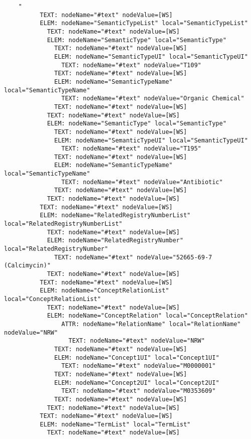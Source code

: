 \documentclass[11pt,english]{article}
\begin{document}
\begin{enumerate}
\begin{lstlisting}
    "
          TEXT: nodeName="#text" nodeValue=[WS]
          ELEM: nodeName="SemanticTypeList" local="SemanticTypeList"
            TEXT: nodeName="#text" nodeValue=[WS]
            ELEM: nodeName="SemanticType" local="SemanticType"
              TEXT: nodeName="#text" nodeValue=[WS]
              ELEM: nodeName="SemanticTypeUI" local="SemanticTypeUI"
                TEXT: nodeName="#text" nodeValue="T109"
              TEXT: nodeName="#text" nodeValue=[WS]
              ELEM: nodeName="SemanticTypeName" local="SemanticTypeName"
                TEXT: nodeName="#text" nodeValue="Organic Chemical"
              TEXT: nodeName="#text" nodeValue=[WS]
            TEXT: nodeName="#text" nodeValue=[WS]
            ELEM: nodeName="SemanticType" local="SemanticType"
              TEXT: nodeName="#text" nodeValue=[WS]
              ELEM: nodeName="SemanticTypeUI" local="SemanticTypeUI"
                TEXT: nodeName="#text" nodeValue="T195"
              TEXT: nodeName="#text" nodeValue=[WS]
              ELEM: nodeName="SemanticTypeName" local="SemanticTypeName"
                TEXT: nodeName="#text" nodeValue="Antibiotic"
              TEXT: nodeName="#text" nodeValue=[WS]
            TEXT: nodeName="#text" nodeValue=[WS]
          TEXT: nodeName="#text" nodeValue=[WS]
          ELEM: nodeName="RelatedRegistryNumberList" local="RelatedRegistryNumberList"
            TEXT: nodeName="#text" nodeValue=[WS]
            ELEM: nodeName="RelatedRegistryNumber" local="RelatedRegistryNumber"
              TEXT: nodeName="#text" nodeValue="52665-69-7 (Calcimycin)"
            TEXT: nodeName="#text" nodeValue=[WS]
          TEXT: nodeName="#text" nodeValue=[WS]
          ELEM: nodeName="ConceptRelationList" local="ConceptRelationList"
            TEXT: nodeName="#text" nodeValue=[WS]
            ELEM: nodeName="ConceptRelation" local="ConceptRelation"
                ATTR: nodeName="RelationName" local="RelationName" nodeValue="NRW"
                  TEXT: nodeName="#text" nodeValue="NRW"
              TEXT: nodeName="#text" nodeValue=[WS]
              ELEM: nodeName="Concept1UI" local="Concept1UI"
                TEXT: nodeName="#text" nodeValue="M0000001"
              TEXT: nodeName="#text" nodeValue=[WS]
              ELEM: nodeName="Concept2UI" local="Concept2UI"
                TEXT: nodeName="#text" nodeValue="M0353609"
              TEXT: nodeName="#text" nodeValue=[WS]
            TEXT: nodeName="#text" nodeValue=[WS]
          TEXT: nodeName="#text" nodeValue=[WS]
          ELEM: nodeName="TermList" local="TermList"
            TEXT: nodeName="#text" nodeValue=[WS]

\end{lstlisting}
\end{enumerate}
\end{document}
